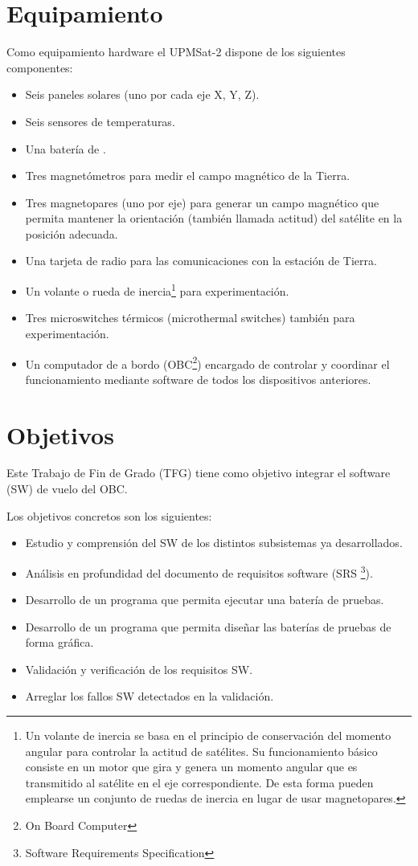 \section{Equipamiento}
\label{sec:equipamiento}
Como equipamiento hardware el UPMSat-2 dispone de los siguientes componentes:
\begin{itemize}
\item Seis paneles solares (uno por cada eje X, Y, Z).
\item Seis sensores de temperaturas.
\item Una batería de .
\item Tres magnetómetros para medir el campo magnético de la Tierra.
\item Tres magnetopares (uno por eje) para generar un campo magnético que permita
  mantener la orientación (también llamada actitud) del satélite en la
  posición adecuada.
\item Una tarjeta de radio para las comunicaciones con la estación de Tierra.
\item Un volante o rueda de inercia\footnote{Un volante de inercia se basa en el
    principio de conservación del momento angular para controlar la actitud de
    satélites. Su funcionamiento básico consiste en un motor que gira y genera
    un momento angular que es transmitido al satélite en el eje correspondiente.
    De esta forma pueden emplearse un conjunto de ruedas de inercia en lugar
    de usar magnetopares.} para experimentación.
\item Tres microswitches térmicos (microthermal switches) también para
  experimentación.
\item Un computador de a bordo (OBC\footnote{On Board Computer}) encargado de
  controlar y coordinar el funcionamiento mediante software de todos los
  dispositivos anteriores.
\end{itemize}
\section{Objetivos}
\label{sec:objetivos}

Este Trabajo de Fin de Grado (TFG) tiene como objetivo integrar el software (SW)
de vuelo del OBC.

Los objetivos concretos son los siguientes:
\begin{itemize}
\item Estudio y comprensión del SW de los distintos subsistemas ya
  desarrollados.
\item Análisis en profundidad del documento de requisitos software\cite{} (SRS
  \footnote{Software Requirements Specification}).
\item Desarrollo de un programa que permita ejecutar una batería de pruebas.
\item Desarrollo de un programa que permita diseñar las baterías de pruebas de
  forma gráfica.
\item Validación y verificación de los requisitos SW.
\item Arreglar los fallos SW detectados en la validación.
\end{itemize}


